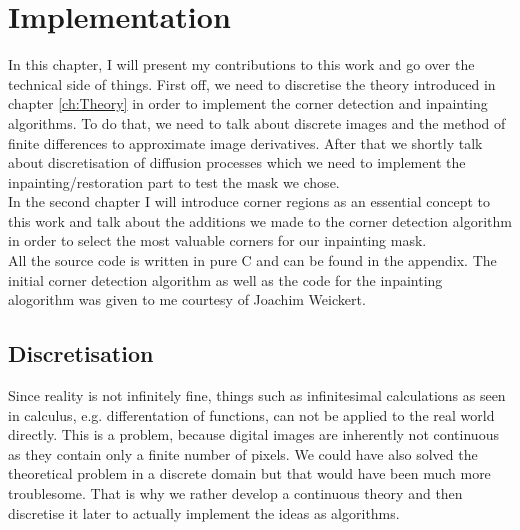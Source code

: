 \chapter{Implementation}\label{ch:Implementation} 
In this chapter, I will present my contributions to this work and go over the technical side of
things. First off, we need to discretise the theory introduced in chapter \ref{ch:Theory} in order
to implement the corner detection and inpainting algorithms. To do that, we need to talk about
discrete images and the method of finite differences to approximate image derivatives.
After that we shortly talk about discretisation of diffusion processes which we need to implement
the inpainting/restoration part to test the mask we chose.\\  
In the second chapter I will introduce corner regions as an essential concept to this work and talk
about the additions we made to the corner detection algorithm in order to select the most valuable
corners for our inpainting mask.\\
All the source code is written in pure C and can be found in the appendix.
The initial corner detection algorithm as well as the code for the inpainting alogorithm was given
to me courtesy of Joachim Weickert.

\section{Discretisation}\label{sec:Discretisation}

Since reality is not infinitely fine, things such as infinitesimal calculations as seen in 
calculus, e.g. differentation of functions, can not be applied to the real world directly.
This is a problem, because digital images are inherently not continuous as they contain only a
finite number of pixels. 
We could have also solved the theoretical problem in a discrete domain but that would have 
been much more troublesome.
That is why we rather develop a continuous theory and then discretise it later to actually
implement the ideas as algorithms.

